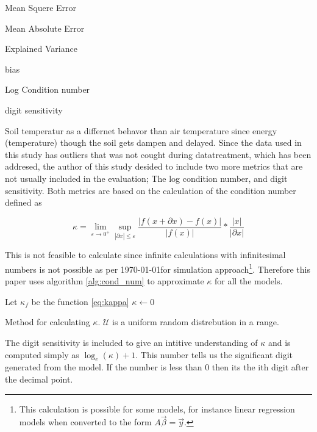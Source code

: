 \begin{itemize*}
	\item Mean Squere Error
	\item Mean Absolute Error
	\item Explained Variance
	\item bias
	\item Log Condition number
	\item digit sensitivity
\end{itemize*}


Soil temperatur as a differnet behavor than air temperature since energy (temperature) though the soil gets dampen and delayed. Since the data used in this study has outliers that was not cought during datatreatment, which has been addresed, the author of this study desided to include two more metrics that are not usually included in the evaluation; The log condition number, and digit sensitivity. Both metrics are based on the calculation of the condition number defined as 

\begin{equation}\label{eq:kappa}
\kappa = \lim\limits_{\varepsilon \to 0^+} \sup\limits_{|\partial x|\leq\varepsilon}  \frac{\left|f(x+\partial x) - f(x)\right|}{|f(x)|}*\frac{|x|}{|\partial x|} 
\end{equation}

This is not feasible to calculate since infinite calculations with infinitesimal numbers is not possible as per \today for simulation approach\footnote{This calculation is possible for some models, for instance linear regression models when converted to the form $A\vec{\beta} = \vec{y}$.}. Therefore this paper uses algorithm \ref{alg:cond_num} to approximate $\kappa$ for all the models.

\begin{algorithm}[H]
	\SetAlgoLined
	Let $\kappa_f$ be the function \ref{eq:kappa}\;
	$\kappa\gets 0$\;
	\Return{$\kappa$}
	\caption[Randommised $\kappa$ algorithm]{Method for calculating $\kappa$. $\mathcal{U}$ is a uniform random distrebution in a range.}
	\label{alg:cond_num}
\end{algorithm}

The digit sensitivity is included to give an intitive understanding of $\kappa$ and is computed simply as $\log_e(\kappa)+1$. This number tells us the significant digit generated from the model. If the number is less than 0 then its the ith digit after the decimal point.

